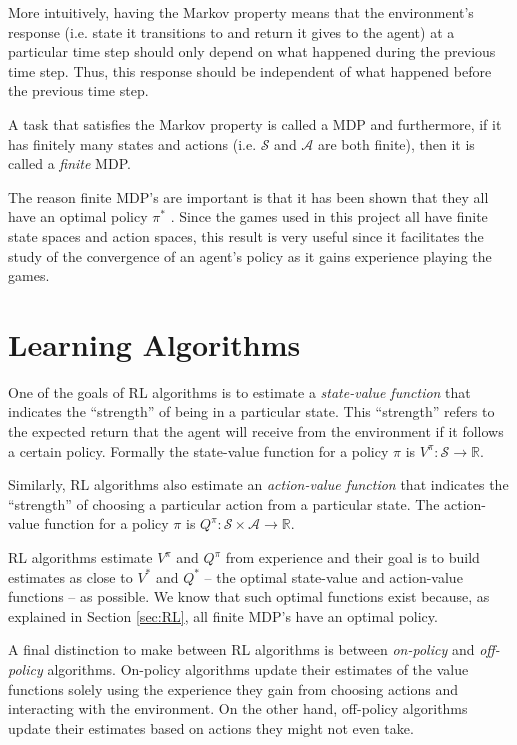 \documentclass[11pt,a4paper]{report}
\begin{document}
More intuitively, having the Markov property means that the environment's response (i.e. state it transitions to and return it gives to the agent) at a particular time step should only depend on what happened during the previous time step. Thus, this response should be independent of what happened before the previous time step.

A task that satisfies the Markov property is called a MDP and furthermore, if it has finitely many states and actions (i.e. $\mathcal{S}$ and $\mathcal{A}$ are both finite), then it is called a \emph{finite} MDP. 

The reason finite MDP's are important is that it has been shown that they all have an optimal policy $\pi^{\ast}$ \cite{rl-book}. Since the games used in this project all have finite state spaces and action spaces, this result is very useful since it facilitates the study of the convergence of an agent's policy as it gains experience playing the games.


\section{Learning Algorithms}
\label{sec:learning-algorithms}

One of the goals of RL algorithms is to estimate a \emph{state-value function} that indicates the ``strength'' of being in a particular state. This ``strength'' refers to the expected return that the agent will receive from the environment if it follows a certain policy. Formally the state-value function for a policy $\pi$ is $V^{\pi} : \mathcal{S} \rightarrow \mathbb{R}$.

Similarly, RL algorithms also estimate an \emph{action-value function} that indicates the ``strength'' of choosing a particular action from a particular state. The action-value function for a policy $\pi$ is $Q^{\pi} : \mathcal{S} \times \mathcal{A} \rightarrow \mathbb{R}$.

RL algorithms estimate $V^{\pi}$ and $Q^{\pi}$ from experience and their goal is to build estimates as close to $V^{\ast}$ and $Q^{\ast}$ -- the optimal state-value and action-value functions -- as possible. We know that such optimal functions exist because, as explained in Section \ref{sec:RL}, all finite MDP's have an optimal policy.

A final distinction to make between RL algorithms is between \emph{on-policy} and \emph{off-policy} algorithms. On-policy algorithms update their estimates of the value functions solely using the experience they gain from choosing actions and interacting with the environment. On the other hand, off-policy algorithms update their estimates based on actions they might not even take.
\end{document}

